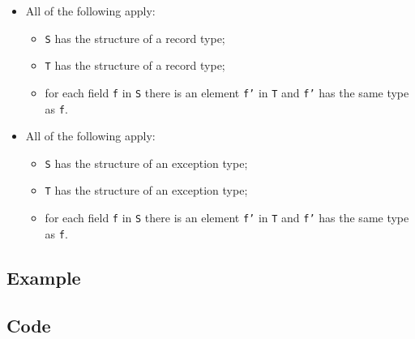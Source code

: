 \documentclass{book}
\begin{document}
\begin{itemize}
  \item All of the following apply:
    \begin{itemize}
    \item \texttt{S} has the structure of a record type;
    \item \texttt{T} has the structure of a record type;
    \item for each field \texttt{f} in \texttt{S} there is an element \texttt{f'} in \texttt{T} and \texttt{f'} has
      the same type as \texttt{f}.
    \end{itemize}

  \item All of the following apply:
    \begin{itemize}
    \item \texttt{S} has the structure of an exception type;
    \item \texttt{T} has the structure of an exception type;
    \item for each field \texttt{f} in \texttt{S} there is an element \texttt{f'} in \texttt{T} and \texttt{f'} has
      the same type as \texttt{f}.
    \end{itemize}
  \end{itemize}

  \subsection{Example}

  \subsection{Code}

\end{document}
